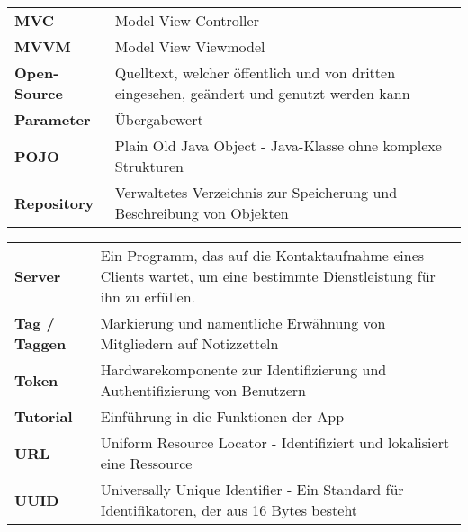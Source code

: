 \begin{table}[h!]
\begin{tabular}{p{4cm}p{10cm}}
				\textbf{MVC} & Model View Controller  \\
				\textbf{MVVM} & Model View Viewmodel  \\
				\textbf{Open-Source} & Quelltext, welcher öffentlich und von dritten eingesehen, geändert und genutzt werden kann  \\
				\textbf{Parameter} & Übergabewert  \\
				\textbf{POJO} & Plain Old Java Object - Java-Klasse ohne komplexe Strukturen  \\
				\textbf{Repository} &  Verwaltetes Verzeichnis zur Speicherung und Beschreibung von Objekten \\
				\end{tabular}
			\end{table}
			
		\begin{table}[h!]
			\label{my-label}
				\begin{tabular}{p{4cm}p{10cm}}
				\textbf{Server} & Ein Programm, das auf die Kontaktaufnahme eines Clients wartet, um eine bestimmte Dienstleistung für ihn zu erfüllen.  \\
				\textbf{Tag / Taggen} &  Markierung und namentliche Erwähnung von Mitgliedern auf Notizzetteln   \\
				\textbf{Token} & Hardwarekomponente zur Identifizierung und Authentifizierung von Benutzern  \\
				\textbf{Tutorial} &  Einführung in die Funktionen der App \\
				\textbf{URL} & Uniform Resource Locator - Identifiziert und lokalisiert eine Ressource \\
				\textbf{UUID} & Universally Unique Identifier - Ein Standard für Identifikatoren, der aus 16 Bytes besteht \\				
			\end{tabular}
		\end{table}